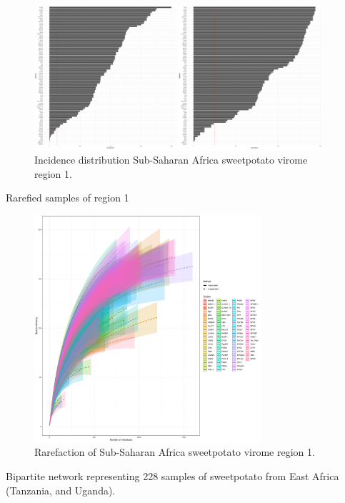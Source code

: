 \documentclass{article}
\begin{document}
\begin{figure}[h!]
\begin{center}
\includegraphics[width=0.95\textwidth]{../results/k-cluster1/1-kcluster_incidence_w+bFeb28.pdf} %
\caption{Incidence distribution Sub-Saharan Africa sweetpotato virome region 1.}
\end{center}
\end{figure}

Rarefied samples of region 1

\begin{figure}[h!]
\begin{center}
\includegraphics[width=0.75\textwidth]{../results/k-cluster1/1-kcluster_rarefaction-iNEXT_Feb28.pdf} %
\caption{Rarefaction of Sub-Saharan Africa sweetpotato virome region 1.}
\end{center}
\end{figure}

Bipartite network representing 228 samples of sweetpotato from East Africa (Tanzania, and Uganda).
\end{document}
